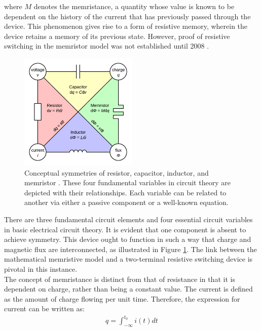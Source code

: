 \noindent where $M$ denotes the memristance, a quantity whose value is known to be dependent on the history of the current that has previously passed through the device. This phenomenon gives rise to a form of resistive memory, wherein the device retains a memory of its previous state. However, proof of resistive switching in the memristor model was not established until 2008 \cite{strukov2008missing}.

\begin{figure}[htbp!] 
    \centering    
    \includegraphics[width=0.5\textwidth]{Chapter1/Figs/1e.png}
    \caption[Conceptual symmetries of resistor, capacitor, inductor, and memristor]{Conceptual symmetries of resistor, capacitor, inductor, and memristor \cite{du2017metal}. These four fundamental variables in circuit theory are depicted with their relationships. Each variable can be related to another via either a passive component or a well-known equation.}
    \label{fig:1e}
\end{figure}

\noindent There are three fundamental circuit elements and four essential circuit variables in basic electrical circuit theory.  It is evident that one component is absent to achieve symmetry. This device ought to function in such a way that charge and magnetic flux are interconnected, as illustrated in Figure \ref{fig:1e}. The link between the mathematical memristive model and a two-terminal resistive switching device is pivotal in this instance. \\

\noindent The concept of memristance is distinct from that of resistance in that it is dependent on charge, rather than being a constant value.  The current is defined as the amount of charge flowing per unit time. Therefore, the expression for current can be written as:
\begin{align}
    q = \int_{-\infty}^{t_0} i(t)dt \label{eq:1.23}
\end{align}

